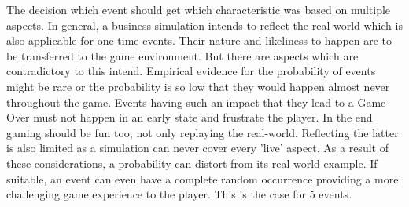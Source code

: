 \documentclass[11pt,titlepage,oneside,openany]{book}
\begin{document}
The decision which event should get which characteristic was based on multiple aspects. In general, a business simulation intends to reflect the real-world which is also applicable for one-time events. Their nature and likeliness to happen are to be transferred to the game environment. But there are aspects which are contradictory to this intend. Empirical evidence for the probability of events might be rare or the probability is so low that they would happen almost never throughout the game. Events having such an impact that they lead to a Game-Over must not happen in an early state and frustrate the player. In the end gaming should be fun too, not only replaying the real-world. Reflecting the latter is also limited as a simulation can never cover every 'live' aspect. As a result of these considerations, a probability can distort from its real-world example. If suitable, an event can even have a complete random occurrence providing a more challenging game experience to the player. This is the case for 5 events. 
\end{document}
